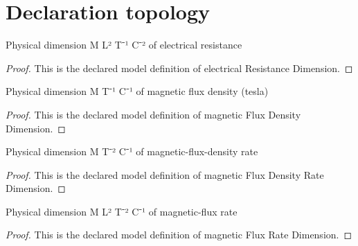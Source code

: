 \section{Declaration topology}
\begin{definition}
  \label{def:physics:phyx-mini-0935:phyxminiproblems-problemphyxmini0935-electricalresistancedimension}
  Physical dimension M L² T⁻¹ C⁻² of electrical resistance
\end{definition}
\begin{proof}
  This is the declared model definition of electrical Resistance Dimension.
\end{proof}
\begin{definition}
  \label{def:physics:phyx-mini-0935:phyxminiproblems-problemphyxmini0935-magneticfluxdensitydimension}
  Physical dimension M T⁻¹ C⁻¹ of magnetic flux density (tesla)
\end{definition}
\begin{proof}
  This is the declared model definition of magnetic Flux Density Dimension.
\end{proof}
\begin{definition}
  \label{def:physics:phyx-mini-0935:phyxminiproblems-problemphyxmini0935-magneticfluxdensityratedimension}
  Physical dimension M T⁻² C⁻¹ of magnetic-flux-density rate
\end{definition}
\begin{proof}
  This is the declared model definition of magnetic Flux Density Rate Dimension.
\end{proof}
\begin{definition}
  \label{def:physics:phyx-mini-0935:phyxminiproblems-problemphyxmini0935-magneticfluxratedimension}
  Physical dimension M L² T⁻² C⁻¹ of magnetic-flux rate
\end{definition}
\begin{proof}
  This is the declared model definition of magnetic Flux Rate Dimension.
\end{proof}
